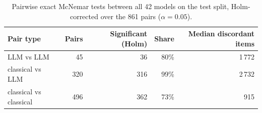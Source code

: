 \begin{table}[t]
\centering
\small
\caption{Pairwise exact McNemar tests between all 42 models on the test split, Holm-corrected over the 861 pairs ($\alpha = 0.05$).}
\label{tab:b-mcnemar}
\begin{tabular}{lrrrr}
\toprule
Pair type & Pairs & Significant (Holm) & Share & Median discordant items \\
\midrule
LLM vs LLM & 45 & 36 & 80\% & 1\,772 \\
classical vs LLM & 320 & 316 & 99\% & 2\,732 \\
classical vs classical & 496 & 362 & 73\% & 915 \\
\bottomrule
\end{tabular}
\end{table}
